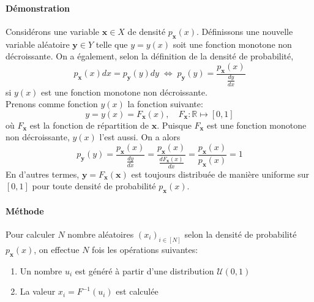 \documentclass[a4paper]{article}
\begin{document}
\paragraph{Démonstration}
Considérons une variable \(\mathbf x\in X\) de densité
\(p_{\mathbf x}(x)\). Définissons une nouvelle variable aléatoire
\(\mathbf y\in Y\) telle que \(y=y(x)\) soit une fonction monotone non
décroissante. On a également, selon la définition de la densité de
probabilité,
\[
	p_{\mathbf x}(x)dx=p_{\mathbf y}(y)dy \;\Leftrightarrow\;
	p_{\mathbf y}(y) = \frac{p_{\mathbf x}(x)}{\frac{dy}{dx}}
\]
si \(y(x)\) est une fonction monotone non décroissante.\\
Prenons comme fonction \(y(x)\) la fonction suivante:
\[y=y(x)=F_{\mathbf x}(x),\quad F_{\mathbf x}:\mathbb{R}\mapsto[0,1]\]
où \(F_{\mathbf x}\) est la fonction de répartition de \(\mathbf x\).
Puisque \(F_{\mathbf x}\) est une fonction monotone non décroissante,
\(y(x)\) l'est aussi.
On a alors
\[
	p_{\mathbf y}(y) = \frac{p_{\mathbf x}(x)}{\frac{dy}{dx}}=
	\frac{p_{\mathbf x}(x)}{\frac{dF_{\mathbf x}(x)}{dx}}=
	\frac{p_{\mathbf x}(x)}{p_{\mathbf x}(x)}=1
\]
En d'autres termes, \(\mathbf y=F_{\mathbf x}(\mathbf x)\) est toujours
distribuée de manière uniforme sur \([0,1]\) pour toute densité de
probabilité \(p_{\mathbf x}(x)\).
\paragraph{Méthode} Pour calculer \(N\) nombre aléatoires
\((x_i)_{i\in[N]}\) selon la densité de probabilité \(p_{\mathbf x}(x)\),
on effectue \(N\) fois les opérations suivantes:
\begin{enumerate}
	\item Un nombre \(u_i\) est généré à partir d'une distribution
		\(\mathcal U(0,1)\)
	\item La valeur \(x_i=F^{-1}(u_i)\) est calculée
\end{enumerate}
\end{document}
